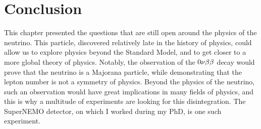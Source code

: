 

\section{Conclusion}

This chapter presented the questions that are still open around the physics of the neutrino.
This particle, discovered relatively late in the history of physics, could allow us to explore physics beyond the Standard Model, and to get closer to a more global theory of physics.
Notably, the observation of the $0\nu\beta\beta$ decay would prove that the neutrino is a Majorana particle, while demonstrating that the lepton number is not a symmetry of physics.
Beyond the physics of the neutrino, such an observation would have great implications in many fields of physics, and this is why a multitude of experiments are looking for this disintegration.
The SuperNEMO detector, on which I worked during my PhD, is one such experiment.
